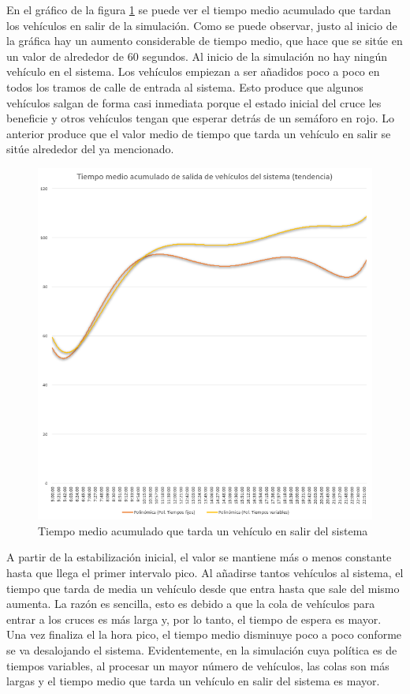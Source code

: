 En el gráfico de la figura \ref{fig:ticks_exit_city2} se puede ver el tiempo medio acumulado que tardan los vehículos en salir de la simulación. Como se puede observar, justo al inicio de la gráfica hay un aumento considerable de tiempo medio, que hace que se sitúe en un valor de alrededor de 60 segundos. Al inicio de la simulación no hay ningún vehículo en el sistema. Los vehículos empiezan a ser añadidos poco a poco en todos los tramos de calle de entrada al sistema. Esto produce que algunos vehículos salgan de forma casi inmediata porque el estado inicial del cruce les beneficie y otros vehículos tengan que esperar detrás de un semáforo en rojo. Lo anterior produce que el valor medio de tiempo que tarda un vehículo en salir se sitúe alrededor del ya mencionado.
\begin{figure}[H]
    \centering
    \includegraphics[width=0.84\linewidth]{text/image/SIMaverageTicksToExitTendenciaCITY2-CONFIG2.png}
    \caption{Tiempo medio acumulado que tarda un vehículo en salir del sistema}
    \label{fig:ticks_exit_city2}
\end{figure}
A partir de la estabilización inicial, el valor se mantiene más o menos constante hasta que llega el primer intervalo pico. Al añadirse tantos vehículos al sistema, el tiempo que tarda de media un vehículo desde que entra hasta que sale del mismo aumenta. La razón es sencilla, esto es debido a que la cola de vehículos para entrar a los cruces es más larga y, por lo tanto, el tiempo de espera es mayor. Una vez finaliza el la hora pico, el tiempo medio disminuye poco a poco conforme se va desalojando el sistema. Evidentemente, en la simulación cuya política es de tiempos variables, al procesar un mayor número de vehículos, las colas son más largas y el tiempo medio que tarda un vehículo en salir del sistema es mayor.

